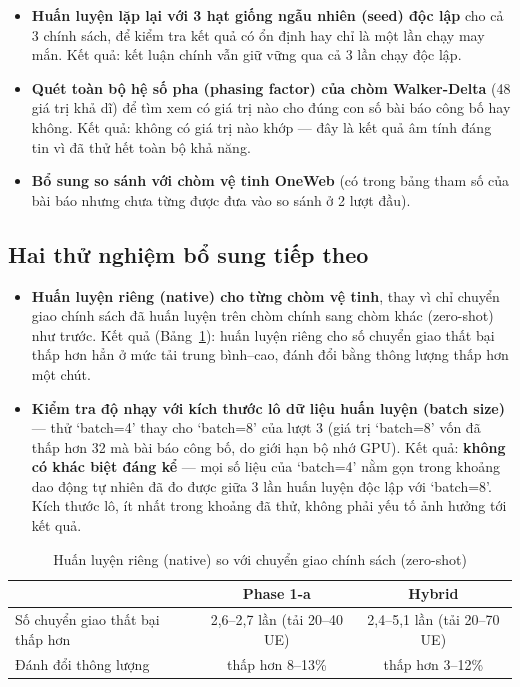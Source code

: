 \documentclass[12pt,a4paper]{article}
\begin{document}
\begin{itemize}[leftmargin=1.2em]
  \item \textbf{Huấn luyện lặp lại với 3 hạt giống ngẫu nhiên (seed) độc lập} cho cả 3 chính
        sách, để kiểm tra kết quả có ổn định hay chỉ là một lần chạy may mắn. Kết quả: kết luận
        chính vẫn giữ vững qua cả 3 lần chạy độc lập.
  \item \textbf{Quét toàn bộ hệ số pha (phasing factor) của chòm Walker-Delta} (48 giá trị khả
        dĩ) để tìm xem có giá trị nào cho đúng con số bài báo công bố hay không. Kết quả: không
        có giá trị nào khớp — đây là kết quả âm tính đáng tin vì đã thử hết toàn bộ khả năng.
  \item \textbf{Bổ sung so sánh với chòm vệ tinh OneWeb} (có trong bảng tham số của bài báo
        nhưng chưa từng được đưa vào so sánh ở 2 lượt đầu).
\end{itemize}

\subsection{Hai thử nghiệm bổ sung tiếp theo}

\begin{itemize}[leftmargin=1.2em]
  \item \textbf{Huấn luyện riêng (native) cho từng chòm vệ tinh}, thay vì chỉ chuyển giao
        chính sách đã huấn luyện trên chòm chính sang chòm khác (zero-shot) như trước. Kết
        quả (Bảng~\ref{tab:native}): huấn luyện riêng cho số chuyển giao thất bại thấp hơn
        hẳn ở mức tải trung bình--cao, đánh đổi bằng thông lượng thấp hơn một chút.
  \item \textbf{Kiểm tra độ nhạy với kích thước lô dữ liệu huấn luyện (batch size)} — thử
        `batch=4' thay cho `batch=8' của lượt 3 (giá trị `batch=8' vốn đã thấp hơn 32 mà bài
        báo công bố, do giới hạn bộ nhớ GPU). Kết quả: \textbf{không có khác biệt đáng kể} —
        mọi số liệu của `batch=4' nằm gọn trong khoảng dao động tự nhiên đã đo được giữa
        3 lần huấn luyện độc lập với `batch=8'. Kích thước lô, ít nhất trong khoảng đã thử,
        không phải yếu tố ảnh hưởng tới kết quả.
\end{itemize}

\begin{table}[h]
\centering\small
\caption{Huấn luyện riêng (native) so với chuyển giao chính sách (zero-shot)}
\label{tab:native}
\begin{tabular}{lcc}
\toprule
 & \textbf{Phase 1-a} & \textbf{Hybrid} \\
\midrule
Số chuyển giao thất bại thấp hơn & 2,6--2,7 lần (tải 20--40 UE) & 2,4--5,1 lần (tải 20--70 UE) \\
Đánh đổi thông lượng & thấp hơn 8--13\% & thấp hơn 3--12\% \\
\bottomrule
\end{tabular}
\end{table}
\end{document}
